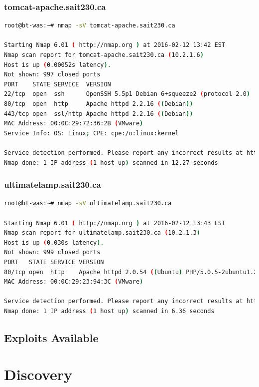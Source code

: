 \documentclass{article}
\begin{document}
\subsubsection{tomcat-apache.sait230.ca}

\begin{lstlisting}[language=bash]
root@bt-was:~# nmap -sV tomcat-apache.sait230.ca

Starting Nmap 6.01 ( http://nmap.org ) at 2016-02-12 13:42 EST
Nmap scan report for tomcat-apache.sait230.ca (10.2.1.6)
Host is up (0.00052s latency).
Not shown: 997 closed ports
PORT    STATE SERVICE  VERSION
22/tcp  open  ssh      OpenSSH 5.5p1 Debian 6+squeeze2 (protocol 2.0)
80/tcp  open  http     Apache httpd 2.2.16 ((Debian))
443/tcp open  ssl/http Apache httpd 2.2.16 ((Debian))
MAC Address: 00:0C:29:72:36:2B (VMware)
Service Info: OS: Linux; CPE: cpe:/o:linux:kernel

Service detection performed. Please report any incorrect results at http://nmap.org/submit/ .
Nmap done: 1 IP address (1 host up) scanned in 12.27 seconds
\end{lstlisting}

\subsubsection{ultimatelamp.sait230.ca}

\begin{lstlisting}[language=bash]
root@bt-was:~# nmap -sV ultimatelamp.sait230.ca

Starting Nmap 6.01 ( http://nmap.org ) at 2016-02-12 13:43 EST
Nmap scan report for ultimatelamp.sait230.ca (10.2.1.3)
Host is up (0.030s latency).
Not shown: 999 closed ports
PORT   STATE SERVICE VERSION
80/tcp open  http    Apache httpd 2.0.54 ((Ubuntu) PHP/5.0.5-2ubuntu1.2)
MAC Address: 00:0C:29:23:94:3C (VMware)

Service detection performed. Please report any incorrect results at http://nmap.org/submit/ .
Nmap done: 1 IP address (1 host up) scanned in 6.36 seconds
\end{lstlisting}

\subsection{Exploits Available}

\newpage
\section{Discovery}
\end{document}
